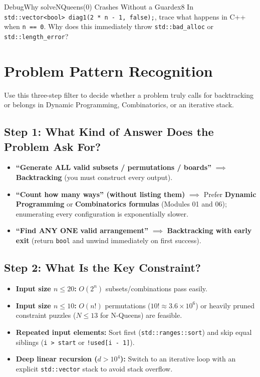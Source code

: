 \documentclass[11pt,a4paper]{article}
\theoremstyle{definition}
\begin{document}
\begin{tryitbox}{Debug}{Why solveNQueens(0) Crashes Without a Guard}{ex8}
In \texttt{std::vector<bool> diag1(2 * n - 1, false);}, trace what happens in C++ when \texttt{n == 0}. Why does this immediately throw \texttt{std::bad\_alloc} or \texttt{std::length\_error}?
\end{tryitbox}

\section{Problem Pattern Recognition}

Use this three-step filter to decide whether a problem truly calls for backtracking or belongs in Dynamic Programming, Combinatorics, or an iterative stack.

\subsection*{Step 1: What Kind of Answer Does the Problem Ask For?}
\begin{itemize}
    \item \textbf{``Generate ALL valid subsets / permutations / boards''} $\implies$ \textbf{Backtracking} (you must construct every output).
    \item \textbf{``Count how many ways'' (without listing them)} $\implies$ Prefer \textbf{Dynamic Programming} or \textbf{Combinatorics formulas} (Modules 01 and 06); enumerating every configuration is exponentially slower.
    \item \textbf{``Find ANY ONE valid arrangement''} $\implies$ \textbf{Backtracking with early exit} (return \texttt{bool} and unwind immediately on first success).
\end{itemize}

\subsection*{Step 2: What Is the Key Constraint?}
\begin{itemize}
    \item \textbf{Input size $n \le 20$:} $O(2^n)$ subsets/combinations pass easily.
    \item \textbf{Input size $n \le 10$:} $O(n!)$ permutations ($10! \approx 3.6 \times 10^6$) or heavily pruned constraint puzzles ($N \le 13$ for N-Queens) are feasible.
    \item \textbf{Repeated input elements:} Sort first (\texttt{std::ranges::sort}) and skip equal siblings (\texttt{i > start} or \texttt{!used[i - 1]}).
    \item \textbf{Deep linear recursion ($d > 10^4$):} Switch to an iterative loop with an explicit \texttt{std::vector} stack to avoid stack overflow.
\end{itemize}
\end{document}
